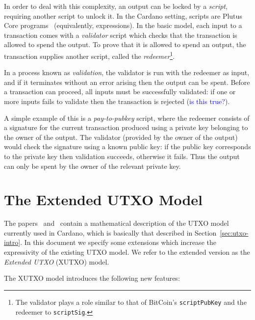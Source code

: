 \documentclass[a4paper]{article}
\newcommand{\blue}[1]{\textcolor{blue}{#1}}
\renewcommand{\i}{\textit}  %
\theoremstyle{definition}  %
\begin{document}
In order to deal with this complexity, an output can be locked by a
\textit{script}, requiring another script to unlock it.  In the
Cardano setting, scripts are Plutus Core
programs~\cite{Plutus-Core-spec} (equivalently, expressions).  In the
basic model, each input to a transaction comes with a \i{validator}
script which checks that the transaction is allowed to spend the
output. To prove that it is allowed to spend an output, the
transaction supplies another script, called the \i{redeemer}\footnote{
  The validator plays a role similar to that of BitCoin's
  \texttt{scriptPubKey} and the redeemer to \texttt{scriptSig}.}.

In a process known as \i{validation}, the validator is run with the
redeemer as input, and if it terminates without an error arising then
the output can be spent.  Before a transaction can proceed, all inputs
must be successfully validated: if one or more inputs fails to validate
then the transaction is rejected (\blue{is this true?}).

A simple example of this is a \i{pay-to-pubkey} script, where the
redeemer consists of a signature for the current transaction produced
using a private key belonging to the owner of the output.  The
validator (provided by the owner of the output) would check the
signature using a known public key: if the public key corresponds to
the private key then validation succeeds, otherwise it fails.  Thus
the output can only be spent by the owner of the relevant private key.

\section{The Extended UTXO Model}
\label{sec:xutxo}
The papers~\cite{Zahnentferner18-UTxO}
and~\cite{Zahnentferner18-Chimeric} contain a mathematical description
of the UTXO model currently used in Cardano, which is basically that
described in Section~\ref{sec:utxo-intro}.  In this document we specify
some extensions which increase the expressivity of the existing UTXO
model.  We refer to the extended version as the \textit{Extended UTXO}
(XUTXO) model.  


The XUTXO model introduces the following new features:
\end{document}
